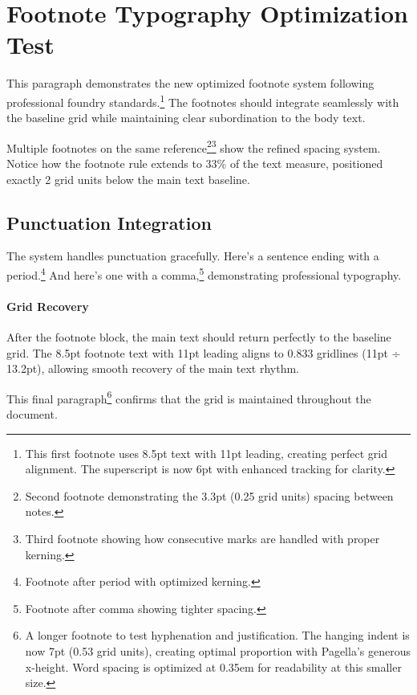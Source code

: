 \documentclass[11pt]{article}
\begin{document}
\section{Footnote Typography Optimization Test}

This paragraph demonstrates the new optimized footnote system following professional foundry standards.\footnote{This first footnote uses 8.5pt text with 11pt leading, creating perfect grid alignment. The superscript is now 6pt with enhanced tracking for clarity.} The footnotes should integrate seamlessly with the baseline grid while maintaining clear subordination to the body text.

Multiple footnotes on the same reference\footnote{Second footnote demonstrating the 3.3pt (0.25 grid units) spacing between notes.}\footnote{Third footnote showing how consecutive marks are handled with proper kerning.} show the refined spacing system. Notice how the footnote rule extends to 33\% of the text measure, positioned exactly 2 grid units below the main text baseline.

\subsection{Punctuation Integration}

The system handles punctuation gracefully. Here's a sentence ending with a period.\footnote{Footnote after period with optimized kerning.} And here's one with a comma,\footnote{Footnote after comma showing tighter spacing.} demonstrating professional typography.

\paragraph{Grid Recovery} After the footnote block, the main text should return perfectly to the baseline grid. The 8.5pt footnote text with 11pt leading aligns to 0.833 gridlines (11pt ÷ 13.2pt), allowing smooth recovery of the main text rhythm.

This final paragraph\footnote{A longer footnote to test hyphenation and justification. The hanging indent is now 7pt (0.53 grid units), creating optimal proportion with Pagella's generous x-height. Word spacing is optimized at 0.35em for readability at this smaller size.} confirms that the grid is maintained throughout the document.
\end{document}
